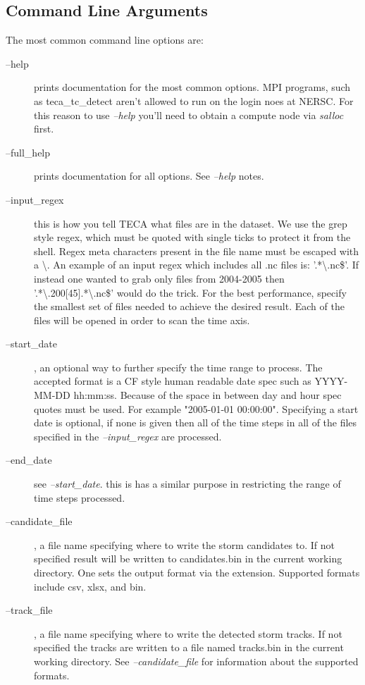 \documentclass[a4paper,10pt,DIV=12]{scrreprt}
\begin{document}
\subsection{Command Line Arguments}
The most common command line options are:
\begin{description}
\item[--help] prints documentation for the most common options. MPI programs, such as teca\_tc\_detect aren't allowed to run on the login noes at NERSC. For this reason to use \textit{--help} you'll need to obtain a compute node via \textit{salloc} first.
\item[--full\_help] prints documentation for all options. See \textit{--help} notes.
\item[--input\_regex]this is how you tell TECA what files are in the dataset. We use the grep style regex, which must be quoted with single ticks to protect it from the shell. Regex meta characters present in the file name must be escaped with a \textbackslash. An example of an input regex which includes all .nc files is: '.*\textbackslash.nc\$'. If instead one wanted to grab only files from 2004-2005 then '.*\textbackslash.200[45].*\textbackslash.nc\$' would do the trick. For the best performance, specify the smallest set of files needed to achieve the desired result. Each of the files will be opened in order to scan the time axis.
\item[--start\_date], an optional way to further specify the time range to process. The accepted format is a CF style human readable date spec such as YYYY-MM-DD hh:mm:ss. Because of the space in between day and hour spec quotes must be used. For example "2005-01-01 00:00:00". Specifying a start date is optional,  if none is given then all of the time steps in all of the files specified in the \textit{--input\_regex} are processed.
\item[--end\_date] see \textit{--start\_date}. this is has a similar purpose in restricting the range of time steps processed.
\item[--candidate\_file], a file name specifying where to write the storm candidates to. If not specified result will be written to candidates.bin in the current working directory. One sets the output format via the extension. Supported formats include csv, xlsx, and bin.
\item[--track\_file], a file name specifying where to write the detected storm tracks. If not specified the tracks are written to a file named tracks.bin in the current working directory. See \textit{--candidate\_file} for information about the supported formats.
\end{description}
\end{document}
